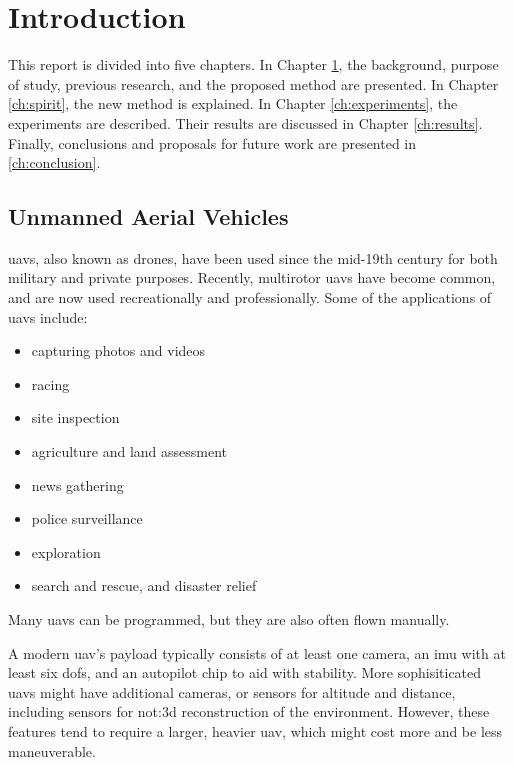 \chapter{Introduction}
\label{ch:intro}
This report is divided into five chapters.
In Chapter \ref{ch:intro}, the background, purpose of study, previous research, and the proposed method are presented.
In Chapter \ref{ch:spirit}, the new method is explained.
In Chapter \ref{ch:experiments}, the experiments are described.
Their results are discussed in Chapter \ref{ch:results}.
Finally, conclusions and proposals for future work are presented in \ref{ch:conclusion}.

\section{Unmanned Aerial Vehicles}
\Glspl{uav}, also known as drones, have been used since the mid-19th century for both military and private purposes.
Recently, multirotor \glspl{uav} have become common, and are now used recreationally and professionally.
Some of the applications of \glspl{uav} include:

\begin{itemize}
  \item capturing photos and videos
  \item racing
  \item site inspection
  \item agriculture and land assessment
  \item news gathering
  \item police surveillance
  \item exploration
  \item search and rescue, and disaster relief
\end{itemize}

Many \glspl{uav} can be programmed, but they are also often flown manually.

A modern \gls{uav}'s payload typically consists of at least one camera, an \gls{imu} with at least six \glspl{dof}, and an autopilot chip to aid with stability.
More sophisiticated \glspl{uav} might have additional cameras, or sensors for altitude and distance, including sensors for \gls{not:3d} reconstruction of the environment.
However, these features tend to require a larger, heavier \gls{uav}, which might cost more and be less maneuverable.

